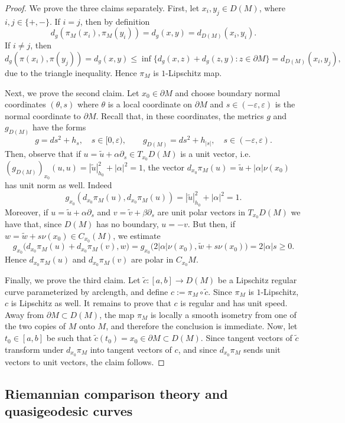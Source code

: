 \documentclass[11pt]{article}
\theoremstyle{definition}
\theoremstyle{remark}
\theoremstyle{plain}
\begin{document}
\begin{proof}
We prove the three claims separately. First, let $x_i,y_j\in D(M)$, where $i,j\in\{+,-\}$. If $i=j$, then by definition
$$d_g(\pi_M(x_i),\pi_M(y_i)) =d_g(x,y)= d_{D(M)}(x_i,y_i).$$
If $i\neq j$, then
$$d_g(\pi(x_i), \pi(y_j)) =d_g(x,y)\leq \inf\{ d_g(x,z)+d_g(z,y): z\in \partial M\} = d_{D(M)}(x_i,y_j),$$
due to the triangle inequality. Hence $\pi_M$ is $1$-Lipschitz map.

Next, we prove the second claim. Let $x_0\in \partial M$ and choose boundary normal coordinates $(\theta,s)$ where $\theta$ is a local coordinate on $\partial M$ and $s\in (-\varepsilon,\varepsilon)$ is the normal coordinate to $\partial M$. Recall that, in these coordinates, the metrics $g$ and $g_{D(M)}$ have the forms
$$g=ds^2+h_s,
\quad s\in [0,\varepsilon),\qquad g_{D(M)}=ds^2+h_{|s|},
\quad s\in (-\varepsilon,\varepsilon).$$
Then, observe that if $u = \tilde u + \alpha\partial_s\in T_{x_0}D(M)$ is a unit vector, i.e. $(g_{D(M)})_{x_0}(u,u) = |\tilde u|_{h_0}^2 + |\alpha|^2 = 1$, the vector $d_{x_0}\pi_M(u) = \tilde u + |\alpha|\nu(x_0)$ has unit norm as well. Indeed
$$g_{x_0}(d_{x_0}\pi_M(u),d_{x_0}\pi_M(u)) = |\tilde u|_{h_0}^2 + |\alpha|^2 = 1.$$
Moreover, if $u = \tilde u + \alpha\partial_s$ and $v = \tilde v + \beta\partial_s$ are unit polar vectors in $T_{x_0}D(M)$ we have that, since $D(M)$ has no boundary, $u = -v$. But then, if $w = \tilde w + s\nu(x_0)\in C_{x_0}(M)$, we estimate
$$g_{x_0}\bigl(d_{x_0}\pi_M(u)+d_{x_0}\pi_M(v),w\bigr)= g_{x_0} \bigl(2|\alpha|\nu(x_0),\tilde w+s\nu(x_0)\bigr)=2|\alpha|s \geq 0.$$
Hence $d_{x_0}\pi_M(u)$ and $d_{x_0}\pi_M(v)$ are polar in $C_{x_0}M$.

Finally, we prove the third claim. Let $\tilde c:[a,b]\to D(M)$ be a Lipschitz regular curve parameterized by arclength, and define $c:=\pi_M\circ \tilde c$. Since $\pi_M$ is $1$-Lipschitz, $c$ is Lipschitz as well. It remains to prove that $c$ is regular and has unit speed. Away from $\partial M\subset D(M)$, the map $\pi_M$ is locally a smooth isometry from one of the two copies of $M$ onto $M$, and therefore the conclusion is immediate. Now, let $t_0\in[a,b]$ be such that $\tilde c(t_0)=x_0\in \partial M\subset D(M)$. Since tangent vectors of $\tilde c$ transform under $d_{x_0}\pi_M$ into tangent vectors of $c$, and since $d_{x_0}\pi_M$ sends unit vectors to unit vectors, the claim follows.
\end{proof}

\subsection{Riemannian comparison theory and quasigeodesic curves}
\end{document}
